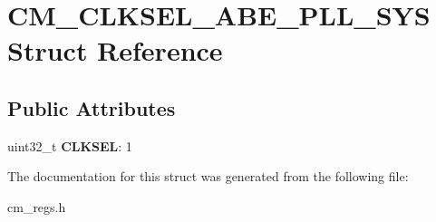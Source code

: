 \hypertarget{structCM__CLKSEL__ABE__PLL__SYS}{\section{C\-M\-\_\-\-C\-L\-K\-S\-E\-L\-\_\-\-A\-B\-E\-\_\-\-P\-L\-L\-\_\-\-S\-Y\-S Struct Reference}
\label{structCM__CLKSEL__ABE__PLL__SYS}
}
\subsection*{Public Attributes}
\begin{DoxyCompactItemize}
\item 
\hypertarget{structCM__CLKSEL__ABE__PLL__SYS_a02633064dfc13bfdc852aef416647397}{uint32\-\_\-t {\bfseries C\-L\-K\-S\-E\-L}\-: 1}\label{structCM__CLKSEL__ABE__PLL__SYS_a02633064dfc13bfdc852aef416647397}

\end{DoxyCompactItemize}


The documentation for this struct was generated from the following file\-:\begin{DoxyCompactItemize}
\item 
cm\-\_\-regs.\-h\end{DoxyCompactItemize}

